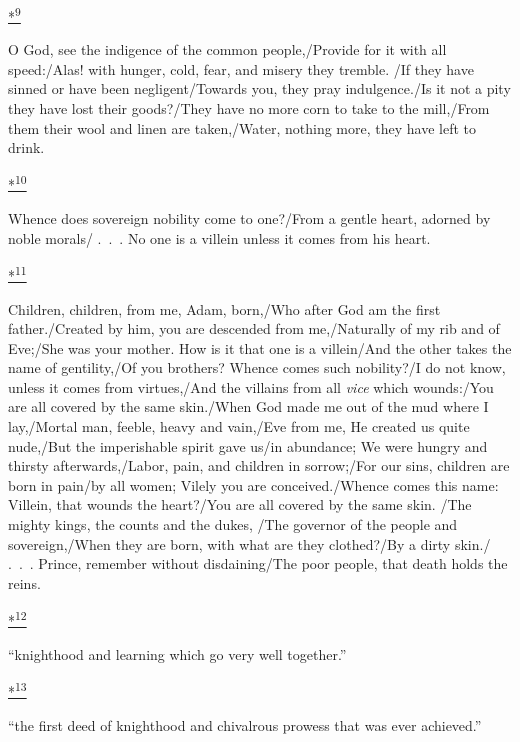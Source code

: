\protect\hypertarget{23_NOTES.xhtmlux5cux23id_2310}{\protect\hyperlink{10_Chapter_Three__THE_HEROIC_DREAM.xhtmlux5cux23id_2309}{*\textsuperscript{9}}}
O God, see the indigence of the common people,/Provide for it with all
speed:/Alas! with hunger, cold, fear, and misery they tremble. /If they
have sinned or have been negligent/Towards you, they pray indulgence./Is
it not a pity they have lost their goods?/They have no more corn to take
to the mill,/From them their wool and linen are taken,/Water, nothing
more, they have left to drink.

\protect\hypertarget{23_NOTES.xhtmlux5cux23id_2482}{\protect\hyperlink{10_Chapter_Three__THE_HEROIC_DREAM.xhtmlux5cux23id_2481}{*\textsuperscript{10}}}
Whence does sovereign nobility come to one?/From a gentle heart, adorned
by noble morals/ .~.~. No one is a villein unless it comes from his
heart.

\protect\hypertarget{23_NOTES.xhtmlux5cux23id_2484}{\protect\hyperlink{10_Chapter_Three__THE_HEROIC_DREAM.xhtmlux5cux23id_2483}{*\textsuperscript{11}}}
Children, children, from me, Adam, born,/Who after God am the first
father./Created by him, you are descended from me,/Naturally of my rib
and of Eve;/She was your mother. How is it that one is a villein/And the
other takes the name of gentility,/Of you brothers? Whence comes such
nobility?/I do not know, unless it comes from virtues,/And the villains
from all \emph{vice} which wounds:/You are all covered by the same
skin./When God made me out of the mud where I lay,/Mortal man, feeble,
heavy and vain,/Eve from me, He created us quite nude,/But the
imperishable spirit gave us/in abundance; We were hungry and thirsty
afterwards,/Labor, pain, and children in sorrow;/For our sins, children
are born in pain/by all women; Vilely you are conceived./Whence comes
this name: Villein, that wounds the heart?/You are all covered by the
same skin. /The mighty kings, the counts and the dukes, /The governor of
the people and sovereign,/When they are born, with what are they
clothed?/By a dirty skin./ .~.~. Prince, remember without disdaining/The
poor people, that death holds the reins.

\protect\hypertarget{23_NOTES.xhtmlux5cux23id_2486}{\protect\hyperlink{10_Chapter_Three__THE_HEROIC_DREAM.xhtmlux5cux23id_2485}{*\textsuperscript{12}}}
``knighthood and learning which go very well together.''

\protect\hypertarget{23_NOTES.xhtmlux5cux23id_2488}{\protect\hyperlink{10_Chapter_Three__THE_HEROIC_DREAM.xhtmlux5cux23id_2487}{*\textsuperscript{13}}}
``the first deed of knighthood and chivalrous prowess that was ever
achieved.''

